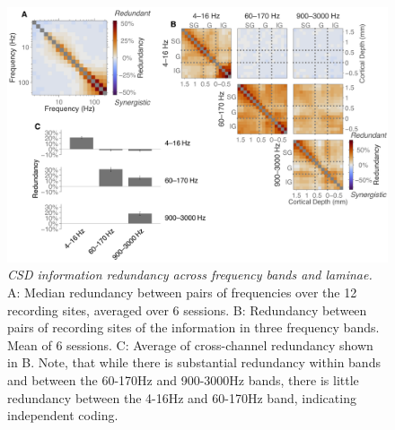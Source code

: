 \documentclass[english,a4paper]{article}
\begin{document}
\begin{figure}
\centering \includegraphics[width=\columnwidth]{fig3}
%
\caption{%
\textit{CSD information redundancy across frequency bands and laminae.}
A: Median redundancy between pairs of frequencies over the 12 recording 
sites, averaged over 6 sessions.
B: Redundancy between pairs of recording sites of the information in three 
frequency bands. Mean of 6 sessions.
C: Average of cross-channel redundancy shown in B.
Note, that while there is substantial redundancy within bands and between the 
60-170Hz and 900-3000Hz bands, there is little redundancy between the 4-16Hz and
60-170Hz band, indicating independent coding.
}
%
\end{figure}
\end{document}
